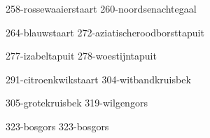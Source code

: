 \begin{figure*}[h!]
    \subfig
    {258-rossewaaierstaart}
    {260-noordsenachtegaal}

    \subfig
    {264-blauwstaart}
    {272-aziatischeroodborsttapuit}

    \subfig
    {277-izabeltapuit}
    {278-woestijntapuit}

    \subfig
    {291-citroenkwikstaart}
    {304-witbandkruisbek}    

    \subfig
    {305-grotekruisbek}
    {319-wilgengors}

    \subfig
    {323-bosgors}
    {323-bosgors}
\end{figure*}